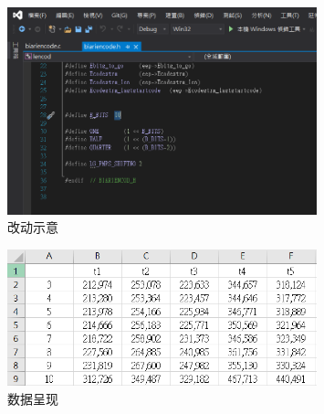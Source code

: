 \documentclass[10pt,UTF8]{ctexart}
\begin{document}
\begin{figure}[H]
\centering 
\includegraphics[width=0.80\textwidth]{r2.png} 
\caption{改动示意}
\label{Test}
\end{figure}

\begin{figure}[H]
\centering 
\includegraphics[width=0.80\textwidth]{r3.png} 
\caption{数据呈现}
\label{Test}
\end{figure}








\clearpage
\end{document}
